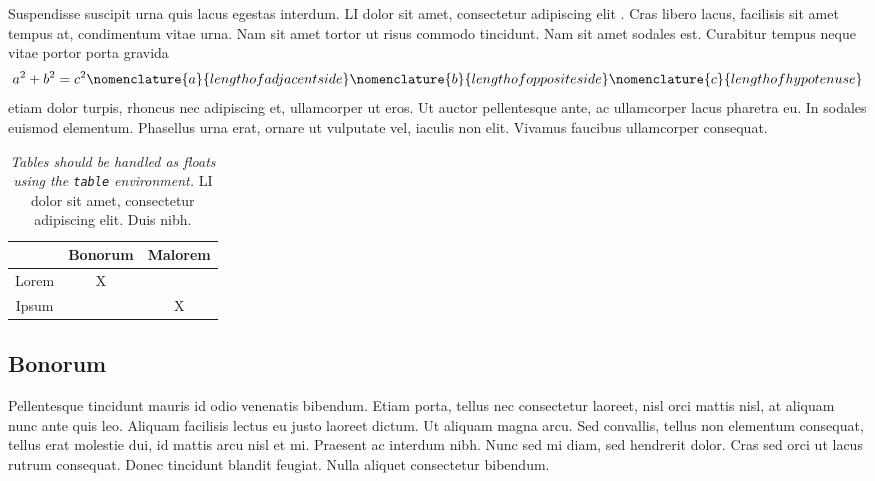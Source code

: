 \documentclass[final,los,index,glossary,loa]{ryethesis}
\begin{document}
Suspendisse suscipit urna quis lacus egestas interdum. \Gls{LI} dolor sit amet, consectetur adipiscing elit \cite{Ryerson:bio}. Cras libero lacus, facilisis sit amet tempus at, condimentum vitae urna. Nam sit amet tortor ut risus commodo tincidunt. Nam sit amet sodales est. Curabitur tempus neque vitae portor porta gravida \cite{Ryerson:v1,Ryerson:v2}
\begin{equation}
a^2+b^2=c^2
\nomenclature{a}{length of adjacent side}
\nomenclature{b}{length of opposite side}
\nomenclature{c}{length of hypotenuse}
\end{equation}
etiam dolor turpis, rhoncus nec adipiscing et, ullamcorper ut eros. Ut auctor pellentesque ante, ac ullamcorper lacus pharetra eu. In sodales euismod elementum. Phasellus urna erat, ornare ut vulputate vel, iaculis non elit. Vivamus faucibus ullamcorper consequat.

\begin{table}
\begin{center}
\begin{tabular}{|c|c|c|}\hline
& \gls{Bonorum} & \gls{Malorem} \\ \hline
Lorem & X & \\\hline
Ipsum &  & X \\\hline
\end{tabular}
\caption[Lorem ipsum dolor sit amet, consectetur adipiscing elit.]{\textit{Tables should be handled as floats using the \texttt{table} environment.} \Gls{LI} dolor sit amet, consectetur adipiscing elit. Duis nibh.}\label{tab::1}
\end{center}
\end{table}

\subsection{Bonorum}
Pellentesque tincidunt mauris id odio venenatis bibendum. Etiam porta, tellus nec consectetur laoreet, nisl orci mattis nisl, at aliquam nunc ante quis leo. Aliquam facilisis lectus eu justo laoreet dictum. Ut aliquam magna arcu. Sed convallis, tellus non elementum consequat, tellus erat molestie dui, id mattis arcu nisl et mi. Praesent ac interdum nibh. Nunc sed mi diam, sed hendrerit dolor. Cras sed orci ut lacus rutrum consequat. Donec tincidunt blandit feugiat. Nulla aliquet consectetur bibendum.
\end{document}
